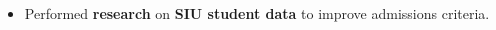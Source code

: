 \documentclass[8pt,a4paper,ragged2e,withhyper]{altacv}
\begin{document}
\begin{paracol}{2}
\begin{itemize}
\item Performed \textbf{research} on \textbf{SIU student data} to improve admissions criteria.

\end{itemize}
\divider









\par


\end{paracol}
\end{document}
